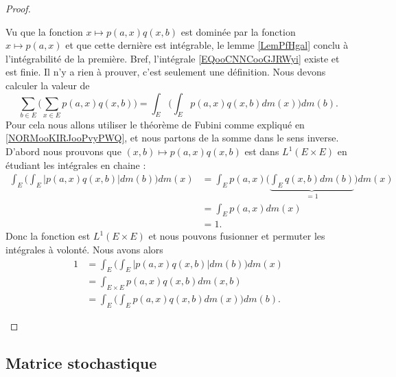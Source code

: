 \begin{proof}
\begin{subproof}
		Vu que la fonction \( x\mapsto p(a,x)q(x,b)\) est dominée par la fonction \( x\mapsto p(a,x)\) et que cette dernière est intégrable, le lemme \ref{LemPfHgal} conclu à l'intégrabilité de la première. Bref, l'intégrale \eqref{EQooCNNCooGJRWyi} existe et est finie.
		Il n'y a rien à prouver, c'est seulement une définition.
		Nous devons calculer la valeur de
		\begin{equation}
			\sum_{b\in E}\big( \sum_{x\in E}p(a,x)q(x,b) \big)=\int_E\big( \int_Ep(a,x)q(x,b)dm(x) \big)dm(b).
		\end{equation}
		Pour cela nous allons utiliser le théorème de Fubini comme expliqué en \ref{NORMooKIRJooPvyPWQ}, et nous partons de la somme dans le sens inverse. D'abord nous prouvons que \( (x,b)\mapsto p(a,x)q(x,b)\) est dans \( L^1(E\times E)\) en étudiant les intégrales en chaine :
		\begin{subequations}
			\begin{align}
				\int_E\Big( \int_E| p(a,x)q(x,b) |dm(b) \Big)dm(x) & =\int_E p(a,x)\Big( \underbrace{\int_Eq(x,b)dm(b)}_{=1} \Big)dm(x) \\
				                                                   & =\int_Ep(a,x)dm(x)                                                 \\
				                                                   & =1.
			\end{align}
		\end{subequations}
		Donc la fonction est \( L^1(E\times E)\) et nous pouvons fusionner et permuter les intégrales à volonté. Nous avons alors
		\begin{subequations}
			\begin{align}
				1 & =\int_E\Big( \int_E| p(a,x)q(x,b) |dm(b) \Big)dm(x) \\
				  & =\int_{E\times E}p(a,x)q(x,b)dm(x,b)                \\
				  & =\int_E\Big( \int_Ep(a,x)q(x,b)dm(x) \Big)dm(b).
			\end{align}
		\end{subequations}
	\end{subproof}
\end{proof}


\subsection{Matrice stochastique}

